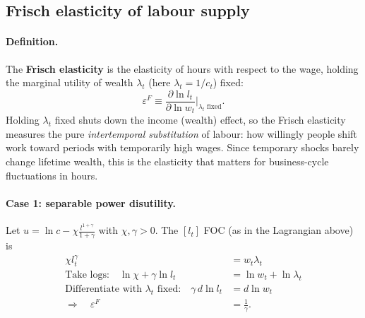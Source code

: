 \subsection{Frisch elasticity of labour supply }

\paragraph{Definition.} The \textbf{Frisch elasticity} is the elasticity of hours with respect to the wage, holding the marginal utility of wealth $\lambda_t$ (here $\lambda_t=1/c_t$) fixed:
\[
\varepsilon^{F}\equiv\frac{\partial\ln l_t}{\partial\ln w_t}\Big|_{\lambda_t\text{ fixed}}.
\]
Holding $\lambda_t$ fixed shuts down the income (wealth) effect, so the Frisch elasticity measures the pure \emph{intertemporal substitution} of labour: how willingly people shift work toward periods with temporarily high wages. Since temporary shocks barely change lifetime wealth, this is the elasticity that matters for business-cycle fluctuations in hours.

\paragraph{Case 1: separable power disutility.} Let $u=\ln c-\chi\frac{l^{1+\gamma}}{1+\gamma}$ with $\chi,\gamma>0$. The $[l_t]$ FOC (as in the Lagrangian above) is
\begin{align*}
\chi l_t^{\gamma}&=w_t\lambda_t\\
\text{Take logs:}\quad \ln\chi+\gamma\ln l_t&=\ln w_t+\ln\lambda_t\\
\text{Differentiate with }\lambda_t\text{ fixed:}\quad \gamma\,d\ln l_t&=d\ln w_t\\
\Rightarrow\quad \varepsilon^F&=\frac1\gamma .
\end{align*}

